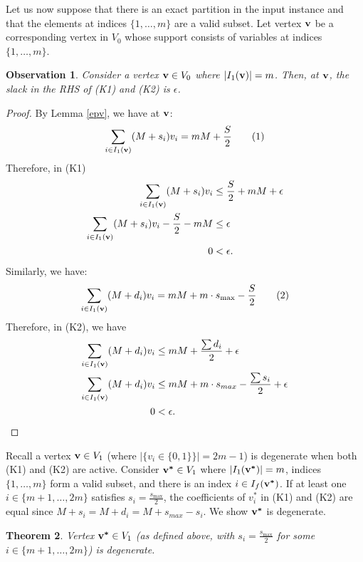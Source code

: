 \documentclass[3p, twocolumn]{elsarticle}
\newtheorem{theorem}{Theorem}[section]
\newtheorem{observation}[theorem]{Observation}
\def\ve#1{\mathchoice{\mbox{\boldmath$\displaystyle\bf#1$}}
{\mbox{\boldmath$\textstyle\bf#1$}}
{\mbox{\boldmath$\scriptstyle\bf#1$}}
{\mbox{\boldmath$\scriptscriptstyle\bf#1$}}}
\begin{document}
Let us now suppose that there is an exact partition in the input instance and that the elements at indices $\{1,\dots,m\}$ are a valid subset. Let vertex $\ve{v}$ be a corresponding vertex in $V_0$ whose support consists of variables at indices $\{1,\dots,m\}$. 
\begin{observation}\label{obs}
    Consider a vertex $\ve{v} \in V_0$ where $|I_1(\ve{v})|=m$. Then, at $\ve{v}$, the slack in the RHS of (K1) and (K2) is $\epsilon$.
\end{observation}
\begin{proof}
By Lemma \ref{epv}, we have at $\ve{v}$:
\begin{align*}
    \sum_{i \in I_1(\ve{v})}(M+s_i)v_i = mM +\frac{S}{2} \tag{1}
\end{align*}
Therefore, in (K1)
\begin{align*}
    \sum_{i \in I_1(\ve{v})}(M+s_i)v_i &\leq  \frac{S}{2} + mM + \epsilon\\
    \sum_{i \in I_1(\ve{v})}(M+s_i)v_i - \frac{S}{2} - mM &\leq \epsilon\\
    0 &< \epsilon. %
\end{align*}
Similarly, we have:
\begin{equation*}
    \sum_{i \in I_1(\ve{v})}(M+d_i)v_i = mM + m\cdot s_{\max} - \frac{S}{2} \tag{2}
\end{equation*}
Therefore, in (K2), we have
\begin{align*}
    \sum_{i \in I_1(\ve{v})}(M+d_i)v_i &\leq mM+ \frac{\sum d_i}{2}+ \epsilon\\
    \sum_{i \in I_1(\ve{v})}(M+d_i)v_i &\leq mM + m\cdot s_{max} - \frac{\sum s_i}{2}+\epsilon\\ 
    0 &< \epsilon. %
\end{align*}

\end{proof}

Recall a vertex $\ve{v} \in V_1$ (where $|\{v_i \in \{0,1\}\}| = 2m-1$) is degenerate when both (K1) and (K2) are active. Consider $\ve{v^*} \in V_1$ where $|I_1(\ve{v^*})| = m$, indices $\{1,\dots,m\}$ form a valid subset, and there is an index $i \in I_f(\ve{v^*})$. If at least one $i \in \{m+1,\dots, 2m\}$ satisfies $s_i = \frac{s_{\max}}{2}$, the coefficients of $v^*_i$ in (K1) and (K2) are equal since $M+s_i = M + d_i = M+s_{max} - s_i$. We show $\ve{v^*}$ is degenerate.

\begin{theorem}
    Vertex $\ve{v^*} \in V_1$ (as defined above, with $s_i = \frac{s_{\max}}{2}$ for some $i \in \{m+1,\ldots,2m\}$) is degenerate.
\end{theorem}
\end{document}

